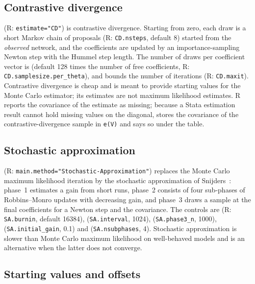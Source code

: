 \subsection{Contrastive divergence}\label{sec:cd}

 (R: \texttt{estimate="CD"}) is contrastive divergence. Starting from zero, each draw is a short Markov chain of  proposals (R: \texttt{CD.nsteps}, default 8) started from the \emph{observed} network, and the coefficients are updated by an importance-sampling Newton step with the Hummel step length. The number of draws per coefficient vector is  (default 128 times the number of free coefficients, R: \texttt{CD.samplesize.per\_theta}), and  bounds the number of iterations (R: \texttt{CD.maxit}). Contrastive divergence is cheap and is meant to provide starting values for the Monte Carlo estimator; its estimates are not maximum likelihood estimates. R reports the covariance of the estimate as missing; because a Stata estimation result cannot hold missing values on the diagonal, \nwergm{} stores the covariance of the contrastive-divergence sample in \texttt{e(V)} and says so under the table.

\subsection{Stochastic approximation}\label{sec:sa}

 (R: \texttt{main.method="Stochastic-Approximation"}) replaces the Monte Carlo maximum likelihood iteration by the stochastic approximation of Snijders~\cite{snijders2002}: phase~1 estimates a gain from short runs, phase~2 consists of four sub-phases of Robbins--Monro updates with decreasing gain, and phase~3 draws a sample at the final coefficients for a Newton step and the covariance. The controls are  (R: \texttt{SA.burnin}, default 16384),  (\texttt{SA.interval}, 1024),  (\texttt{SA.phase3\_n}, 1000),  (\texttt{SA.initial\_gain}, 0.1) and  (\texttt{SA.nsubphases}, 4). Stochastic approximation is slower than Monte Carlo maximum likelihood on well-behaved models and is an alternative when the latter does not converge.

\subsection{Starting values and offsets}


